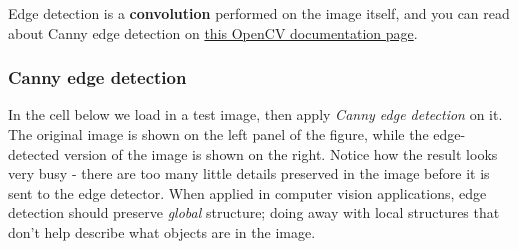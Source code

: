 \documentclass[11pt]{article}
\begin{document}
Edge detection is a \textbf{convolution} performed on the image itself,
and you can read about Canny edge detection on
\href{http://docs.opencv.org/2.4/doc/tutorials/imgproc/imgtrans/canny_detector/canny_detector.html}{this
OpenCV documentation page}.

    \subsubsection{Canny edge detection}\label{canny-edge-detection}

In the cell below we load in a test image, then apply \emph{Canny edge
detection} on it. The original image is shown on the left panel of the
figure, while the edge-detected version of the image is shown on the
right. Notice how the result looks very busy - there are too many little
details preserved in the image before it is sent to the edge detector.
When applied in computer vision applications, edge detection should
preserve \emph{global} structure; doing away with local structures that
don't help describe what objects are in the image.
\end{document}
